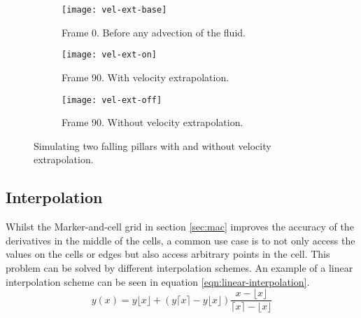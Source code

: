 \documentclass[twocolumn]{article}
\begin{document}
\begin{figure*}
  \centering
    \begin{subfigure}[b]{.3\textwidth}
        \centering
        \texttt{[image: vel-ext-base]}
        \caption{Frame 0. Before any advection of the fluid.}
        \label{fig:vel-ext-base}
    \end{subfigure}
    \begin{subfigure}[b]{.3\textwidth}
        \centering
        \texttt{[image: vel-ext-on]}
        \caption{Frame 90. With velocity extrapolation.}
        \label{fig:vel-ext-on}
    \end{subfigure}
    \begin{subfigure}[b]{.3\textwidth}
        \centering
        \texttt{[image: vel-ext-off]}
        \caption{Frame 90. Without velocity extrapolation.}
        \label{fig:vel-ext-off}
    \end{subfigure}
    \caption{Simulating two falling pillars with and without velocity extrapolation.}\label{fig:velocity-extrapolation}
\end{figure*}

\subsection{Interpolation}
Whilst the Marker-and-cell grid in section \ref{sec:mac} improves the accuracy of the derivatives in the middle of the cells, a common use case is to not only access the values on the cells or edges but also access arbitrary points in the cell. This problem can be solved by different interpolation schemes. An example of a linear interpolation scheme can be seen in equation \ref{eqn:linear-interpolation}.
\begin{equation}
  y(x) = y\lfloor x \rfloor + (y\lceil x \rceil - y\lfloor x \rfloor) \frac{x-\lfloor x \rfloor}{\lceil x \rceil -\lfloor x \rfloor}
  \label{eqn:linear-interpolation}
\end{equation}
\end{document}
